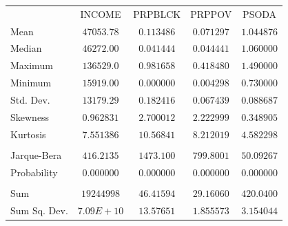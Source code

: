 \documentclass[12pt]{report}
\begin{document}
\begin{table}[H]
	\centering
	\begin{tabular}{lrrrr}
		\multicolumn{1}{c}{}&\multicolumn{1}{c}{INCOME}&\multicolumn{1}{c}{PRPBLCK}&\multicolumn{1}{c}{PRPPOV}&\multicolumn{1}{c}{PSODA}\\
		\multicolumn{1}{l}{Mean}&\multicolumn{1}{c}{$47053.78$}&\multicolumn{1}{c}{$0.113486$}&\multicolumn{1}{c}{$0.071297$}&\multicolumn{1}{c}{$1.044876$}\\
		\multicolumn{1}{l}{Median}&\multicolumn{1}{c}{$46272.00$}&\multicolumn{1}{c}{$0.041444$}&\multicolumn{1}{c}{$0.044441$}&\multicolumn{1}{c}{$1.060000$}\\
		\multicolumn{1}{l}{Maximum}&\multicolumn{1}{c}{$136529.0$}&\multicolumn{1}{c}{$0.981658$}&\multicolumn{1}{c}{$0.418480$}&\multicolumn{1}{c}{$1.490000$}\\
		\multicolumn{1}{l}{Minimum}&\multicolumn{1}{c}{$15919.00$}&\multicolumn{1}{c}{$0.000000$}&\multicolumn{1}{c}{$0.004298$}&\multicolumn{1}{c}{$0.730000$}\\
		\multicolumn{1}{l}{Std. Dev.}&\multicolumn{1}{c}{$13179.29$}&\multicolumn{1}{c}{$0.182416$}&\multicolumn{1}{c}{$0.067439$}&\multicolumn{1}{c}{$0.088687$}\\
		\multicolumn{1}{l}{Skewness}&\multicolumn{1}{c}{$0.962831$}&\multicolumn{1}{c}{$2.700012$}&\multicolumn{1}{c}{$2.222999$}&\multicolumn{1}{c}{$0.348905$}\\
		\multicolumn{1}{l}{Kurtosis}&\multicolumn{1}{c}{$7.551386$}&\multicolumn{1}{c}{$10.56841$}&\multicolumn{1}{c}{$8.212019$}&\multicolumn{1}{c}{$4.582298$}\\
		\multicolumn{1}{c}{}&\multicolumn{1}{c}{}&\multicolumn{1}{c}{}&\multicolumn{1}{c}{}&\multicolumn{1}{c}{}\\
		\multicolumn{1}{l}{Jarque-Bera}&\multicolumn{1}{c}{$416.2135$}&\multicolumn{1}{c}{$1473.100$}&\multicolumn{1}{c}{$799.8001$}&\multicolumn{1}{c}{$50.09267$}\\
		\multicolumn{1}{l}{Probability}&\multicolumn{1}{c}{$0.000000$}&\multicolumn{1}{c}{$0.000000$}&\multicolumn{1}{c}{$0.000000$}&\multicolumn{1}{c}{$0.000000$}\\
		\multicolumn{1}{c}{}&\multicolumn{1}{c}{}&\multicolumn{1}{c}{}&\multicolumn{1}{c}{}&\multicolumn{1}{c}{}\\
		\multicolumn{1}{l}{Sum}&\multicolumn{1}{c}{$19244998$}&\multicolumn{1}{c}{$46.41594$}&\multicolumn{1}{c}{$29.16060$}&\multicolumn{1}{c}{$420.0400$}\\
		\multicolumn{1}{l}{Sum Sq. Dev.}&\multicolumn{1}{c}{$7.09E+10$}&\multicolumn{1}{c}{$13.57651$}&\multicolumn{1}{c}{$1.855573$}&\multicolumn{1}{c}{$3.154044$}\\

\end{tabular}
\end{table}
\end{document}
